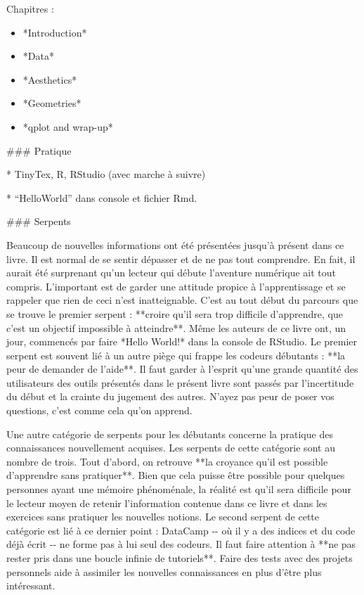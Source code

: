 \documentclass[
  letterpaper,
]{scrbook}
\begin{document}
Chapitres :

\begin{itemize}
\item
  *Introduction*
\item
  *Data*
\item
  *Aesthetics*
\item
  *Geometries*
\item
  *qplot and wrap-up*
\end{itemize}

\#\#\# Pratique

* TinyTex, R, RStudio (avec marche à suivre)

* ``HelloWorld'' dans console et fichier Rmd.

\#\#\# Serpents

Beaucoup de nouvelles informations ont été présentées jusqu'à présent
dans ce livre. Il est normal de se sentir dépasser et de ne pas tout
comprendre. En fait, il aurait été surprenant qu'un lecteur qui débute
l'aventure numérique ait tout compris. L'important est de garder une
attitude propice à l'apprentissage et se rappeler que rien de ceci n'est
inatteignable. C'est au tout début du parcours que se trouve le premier
serpent : **croire qu'il sera trop difficile d'apprendre, que c'est un
objectif impossible à atteindre**. Même les auteurs de ce livre ont, un
jour, commencés par faire *Hello World!* dans la console de RStudio. Le
premier serpent est souvent lié à un autre piège qui frappe les codeurs
débutants : **la peur de demander de l'aide**. Il faut garder à l'esprit
qu'une grande quantité des utilisateurs des outils présentés dans le
présent livre sont passés par l'incertitude du début et la crainte du
jugement des autres. N'ayez pas peur de poser vos questions, c'est comme
cela qu'on apprend.

Une autre catégorie de serpents pour les débutants concerne la pratique
des connaissances nouvellement acquises. Les serpents de cette catégorie
sont au nombre de trois. Tout d'abord, on retrouve **la croyance qu'il
est possible d'apprendre sans pratiquer**. Bien que cela puisse être
possible pour quelques personnes ayant une mémoire phénoménale, la
réalité est qu'il sera difficile pour le lecteur moyen de retenir
l'information contenue dans ce livre et dans les exercices sans
pratiquer les nouvelles notions. Le second serpent de cette catégorie
est lié à ce dernier point : DataCamp -\/- où il y a des indices et du
code déjà écrit -\/- ne forme pas à lui seul des codeurs. Il faut faire
attention à **ne pas rester pris dans une boucle infinie de tutoriels**.
Faire des tests avec des projets personnels aide à assimiler les
nouvelles connaissances en plus d'être plus intéressant.
\end{document}
